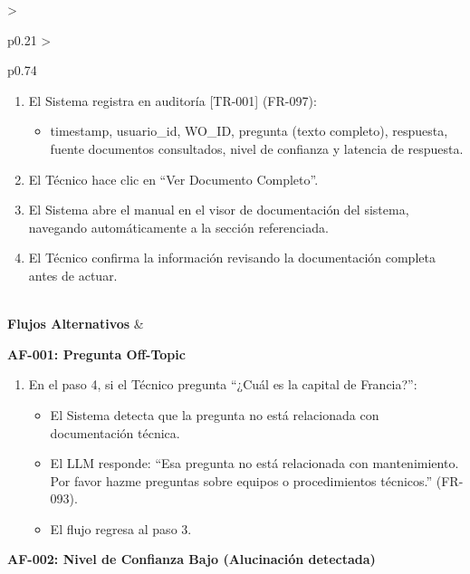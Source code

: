 \begin{longtable}{>{\raggedright\arraybackslash}p{0.21\textwidth} >{\raggedright\arraybackslash}p{0.74\textwidth}}
{\begin{enumerate}[leftmargin=1.5em, nosep, topsep=0pt]
\begin{itemize}[leftmargin=1.2em, nosep, topsep=0pt]
\item Cita con formato destacado (negrita).
\item Botón ``Ver Documento Completo'' (FR-098).
\item Indicador de confianza técnica.
\end{itemize}
\item El Sistema registra en auditoría [TR-001] (FR-097):
\begin{itemize}[leftmargin=1.2em, nosep, topsep=0pt]
\item timestamp, usuario\_id, WO\_ID, pregunta (texto completo), respuesta, fuente documentos consultados, nivel de confianza y latencia de respuesta.
\end{itemize}
\item El Técnico hace clic en ``Ver Documento Completo''.
\item El Sistema abre el manual en el visor de documentación del sistema, navegando automáticamente a la sección referenciada.
\item El Técnico confirma la información revisando la documentación completa antes de actuar.
\end{enumerate} \vspace{2pt}} \\
\textbf{Flujos Alternativos} & \parbox[t]{\linewidth}{\vspace{2pt} \vspace{4pt}\noindent\textbf{AF-001: Pregunta Off-Topic}
\newline
\begin{enumerate}[leftmargin=1.5em, nosep, topsep=0pt]
\item En el paso 4, si el Técnico pregunta ``¿Cuál es la capital de Francia?'':
\begin{itemize}[leftmargin=1.2em, nosep, topsep=0pt]
\item El Sistema detecta que la pregunta no está relacionada con documentación técnica.
\item El LLM responde: ``Esa pregunta no está relacionada con mantenimiento. Por favor hazme preguntas sobre equipos o procedimientos técnicos.'' (FR-093).
\item El flujo regresa al paso 3.
\end{itemize}
\end{enumerate}
\vspace{4pt}\noindent\textbf{AF-002: Nivel de Confianza Bajo (Alucinación detectada)}
\newline
\begin{enumerate}[leftmargin=1.5em, nosep, topsep=0pt]

\end{enumerate}}
\end{longtable}
